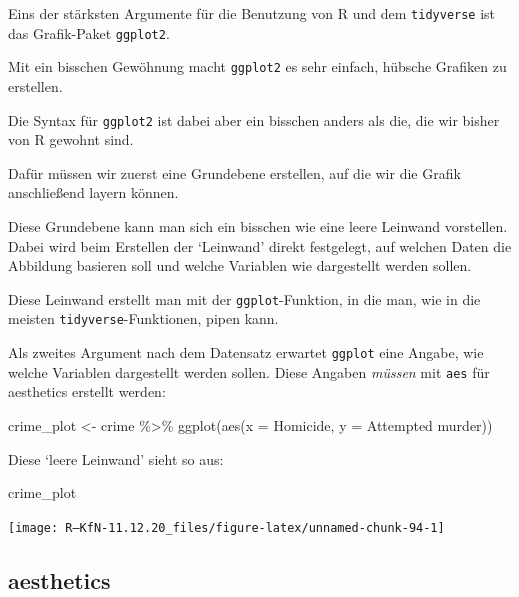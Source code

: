 \documentclass[
]{book}
\newenvironment{Shaded}{\begin{snugshade}}{\end{snugshade}}
\newcommand{\AttributeTok}[1]{\textcolor[rgb]{0.77,0.63,0.00}{#1}}
\newcommand{\FunctionTok}[1]{\textcolor[rgb]{0.00,0.00,0.00}{#1}}
\newcommand{\NormalTok}[1]{#1}
\newcommand{\OtherTok}[1]{\textcolor[rgb]{0.56,0.35,0.01}{#1}}
\newcommand{\SpecialCharTok}[1]{\textcolor[rgb]{0.00,0.00,0.00}{#1}}
\newcommand{\StringTok}[1]{\textcolor[rgb]{0.31,0.60,0.02}{#1}}
\begin{document}
Eins der stärksten Argumente für die Benutzung von R und dem \texttt{tidyverse} ist das Grafik-Paket \texttt{ggplot2}.

Mit ein bisschen Gewöhnung macht \texttt{ggplot2} es sehr einfach, hübsche Grafiken zu erstellen.

Die Syntax für \texttt{ggplot2} ist dabei aber ein bisschen anders als die, die wir bisher von R gewohnt sind.

Dafür müssen wir zuerst eine Grundebene erstellen, auf die wir die Grafik anschließend layern können.

Diese Grundebene kann man sich ein bisschen wie eine leere Leinwand vorstellen.
Dabei wird beim Erstellen der `Leinwand' direkt festgelegt, auf welchen Daten die Abbildung basieren soll und welche Variablen wie dargestellt werden sollen.

Diese Leinwand erstellt man mit der \texttt{ggplot}-Funktion, in die man, wie in die meisten \texttt{tidyverse}-Funktionen, pipen kann.

Als zweites Argument nach dem Datensatz erwartet \texttt{ggplot} eine Angabe, wie welche Variablen dargestellt werden sollen. Diese Angaben \emph{müssen} mit \texttt{aes} für aesthetics erstellt werden:

\begin{Shaded}
\begin{Highlighting}[]
\NormalTok{crime\_plot }\OtherTok{\textless{}{-}}\NormalTok{ crime }\SpecialCharTok{\%\textgreater{}\%} 
  \FunctionTok{ggplot}\NormalTok{(}\FunctionTok{aes}\NormalTok{(}\AttributeTok{x =}\NormalTok{ Homicide, }\AttributeTok{y =} \StringTok{\textasciigrave{}}\AttributeTok{Attempted murder}\StringTok{\textasciigrave{}}\NormalTok{))}
\end{Highlighting}
\end{Shaded}

Diese `leere Leinwand' sieht so aus:

\begin{Shaded}
\begin{Highlighting}[]
\NormalTok{crime\_plot}
\end{Highlighting}
\end{Shaded}

\begin{center}\texttt{[image: R---KfN-11.12.20\_files/figure-latex/unnamed-chunk-94-1]} \end{center}

\hypertarget{aesthetics}{%
\subsection{aesthetics}\label{aesthetics}}
\end{document}
